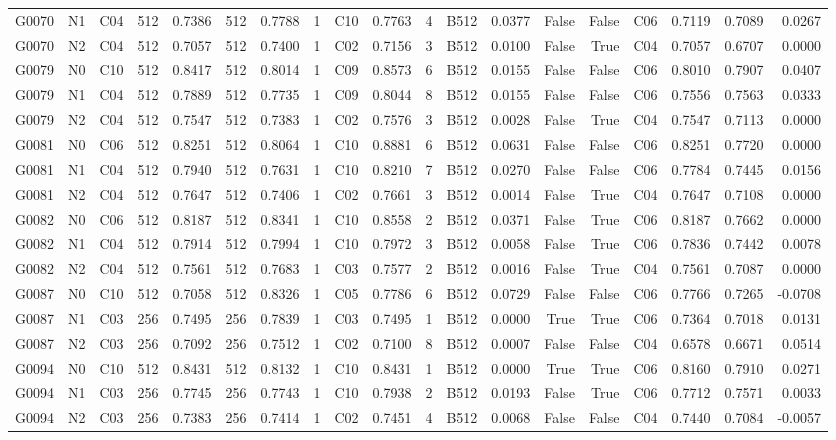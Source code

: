 \begin{tabular}{lllrrrrrlrrlrrrlrrr}
G0070 & N1 & C04 & 512 & 0.7386 & 512 & 0.7788 & 1 & C10 & 0.7763 & 4 & B512 & 0.0377 & False & False & C06 & 0.7119 & 0.7089 & 0.0267 \\
G0070 & N2 & C04 & 512 & 0.7057 & 512 & 0.7400 & 1 & C02 & 0.7156 & 3 & B512 & 0.0100 & False & True & C04 & 0.7057 & 0.6707 & 0.0000 \\
G0079 & N0 & C10 & 512 & 0.8417 & 512 & 0.8014 & 1 & C09 & 0.8573 & 6 & B512 & 0.0155 & False & False & C06 & 0.8010 & 0.7907 & 0.0407 \\
G0079 & N1 & C04 & 512 & 0.7889 & 512 & 0.7735 & 1 & C09 & 0.8044 & 8 & B512 & 0.0155 & False & False & C06 & 0.7556 & 0.7563 & 0.0333 \\
G0079 & N2 & C04 & 512 & 0.7547 & 512 & 0.7383 & 1 & C02 & 0.7576 & 3 & B512 & 0.0028 & False & True & C04 & 0.7547 & 0.7113 & 0.0000 \\
G0081 & N0 & C06 & 512 & 0.8251 & 512 & 0.8064 & 1 & C10 & 0.8881 & 6 & B512 & 0.0631 & False & False & C06 & 0.8251 & 0.7720 & 0.0000 \\
G0081 & N1 & C04 & 512 & 0.7940 & 512 & 0.7631 & 1 & C10 & 0.8210 & 7 & B512 & 0.0270 & False & False & C06 & 0.7784 & 0.7445 & 0.0156 \\
G0081 & N2 & C04 & 512 & 0.7647 & 512 & 0.7406 & 1 & C02 & 0.7661 & 3 & B512 & 0.0014 & False & True & C04 & 0.7647 & 0.7108 & 0.0000 \\
G0082 & N0 & C06 & 512 & 0.8187 & 512 & 0.8341 & 1 & C10 & 0.8558 & 2 & B512 & 0.0371 & False & True & C06 & 0.8187 & 0.7662 & 0.0000 \\
G0082 & N1 & C04 & 512 & 0.7914 & 512 & 0.7994 & 1 & C10 & 0.7972 & 3 & B512 & 0.0058 & False & True & C06 & 0.7836 & 0.7442 & 0.0078 \\
G0082 & N2 & C04 & 512 & 0.7561 & 512 & 0.7683 & 1 & C03 & 0.7577 & 2 & B512 & 0.0016 & False & True & C04 & 0.7561 & 0.7087 & 0.0000 \\
G0087 & N0 & C10 & 512 & 0.7058 & 512 & 0.8326 & 1 & C05 & 0.7786 & 6 & B512 & 0.0729 & False & False & C06 & 0.7766 & 0.7265 & -0.0708 \\
G0087 & N1 & C03 & 256 & 0.7495 & 256 & 0.7839 & 1 & C03 & 0.7495 & 1 & B512 & 0.0000 & True & True & C06 & 0.7364 & 0.7018 & 0.0131 \\
G0087 & N2 & C03 & 256 & 0.7092 & 256 & 0.7512 & 1 & C02 & 0.7100 & 8 & B512 & 0.0007 & False & False & C04 & 0.6578 & 0.6671 & 0.0514 \\
G0094 & N0 & C10 & 512 & 0.8431 & 512 & 0.8132 & 1 & C10 & 0.8431 & 1 & B512 & 0.0000 & True & True & C06 & 0.8160 & 0.7910 & 0.0271 \\
G0094 & N1 & C03 & 256 & 0.7745 & 256 & 0.7743 & 1 & C10 & 0.7938 & 2 & B512 & 0.0193 & False & True & C06 & 0.7712 & 0.7571 & 0.0033 \\
G0094 & N2 & C03 & 256 & 0.7383 & 256 & 0.7414 & 1 & C02 & 0.7451 & 4 & B512 & 0.0068 & False & False & C04 & 0.7440 & 0.7084 & -0.0057 \\
\bottomrule
\end{tabular}
